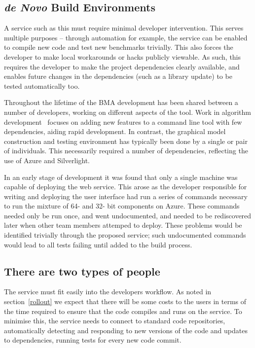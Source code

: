 \documentclass{llncs}
\begin{document}
\subsection{{\em de Novo} Build Environments} 
 
A service such as this must require minimal developer intervention.
This serves multiple purposes -- through automation for example, the
service can be enabled to compile new code and test new benchmarks
trivially. This also forces the developer to make local workarounds or
hacks publicly viewable. As such, this requires the developer to make
the project dependencies clearly available, and enables future changes
in the dependencies (such as a library update) to be tested
automatically too.

Throughout the lifetime of the BMA development has been shared between a 
number of developers, working on different aspects of the tool. Work in 
algorithm development~\cite{cook2014,piterman2013} focuses on adding 
new features to a command line tool with few dependencies, aiding rapid 
development. In contrast, the graphical model construction and testing 
environment has typically been done by a single or pair of individuals. 
This necessarily required a number of dependencies, reflecting the use
of Azure and Silverlight.

In an early stage of development it was found that only a single machine 
was capable of deploying the web service. This arose as the developer 
responsible for writing and deploying the user interface had run a series
of commands necessary to run the mixture of 64- and 32- bit components on
Azure. These commands needed only be run once, and went undocumented, and 
needed to be rediscovered later when other team members attemped to deploy.
These problems would be identified trivially through the proposed service;
such undocumented commands would lead to all tests failing until added to 
the build process.

\subsection{There are two types of people} 
The service must fit easily into the developers workflow. As
noted in section~\ref{rollout} we expect that there will be some costs
to the users in terms of the time required to ensure that the code
compiles and runs on the service. To minimise this, the service needs
to connect to standard code repositories, automatically detecting and
responding to new versions of the code and updates to dependencies,
running tests for every new code commit.
\end{document}
